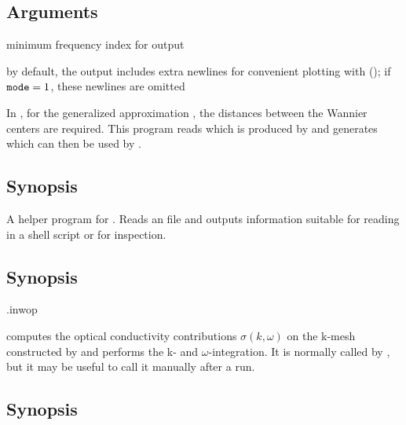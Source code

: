 \subsection{Arguments}
\begin{options}
\item [\Nfreq] minimum frequency index for output

\item [\codeit{mode}]  by default, the output includes
  extra newlines for convenient plotting with \gnuplot (); if $\texttt{mode} = 1$,
  these newlines are omitted
  
\end{options}



In \woptic, for the generalized  approximation
\cite{Tomczak2009a}, the distances between the Wannier centers are
required.  This program reads  which is
produced by \wannier and generates  which can
then be used by \woptic.

\subsection{Synopsis}
\begin{usage}
  \obdist \case
\end{usage}



A helper program for \woprog.  Reads an  file and outputs
information suitable for reading in a shell script or for inspection.

\subsection{Synopsis}
\begin{usage}
  \inwopcheck \case.inwop
\end{usage}



\womain computes the optical conductivity contributions $σ(k,ω)$ on
the k-mesh constructed by  and performs the k- and
$ω$-integration.  It is normally called by \woprog, but it may be
useful to call it manually after a \woprog run.

\subsection{Synopsis}
\begin{usage}
  \womain [\td{}band] \case
\end{usage}

